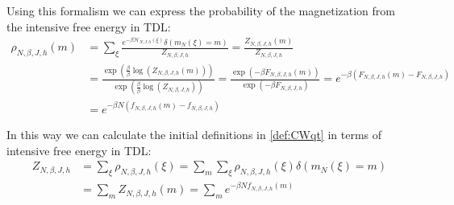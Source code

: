 \begin{proposition}
    Using this formalism we can express the probability of the magnetization from the intensive free energy in TDL:
    \begin{align}
        \rho_{N,\beta,J,h}(m) &= \sum_{\xi}\frac{ e^{-\beta \mathcal{H}_{N,J,h}(\xi)}  \delta\left(m_N(\xi)
        = m\right)}{Z_{N,\beta,J,h}}
        = \frac{Z_{N,\beta,J,h}(m)}{Z_{N,\beta,J,h}} \nonumber \\
        &= \frac{\exp\left(\frac{\beta}{\beta}\log\left(Z_{N,\beta,J,h}\left(m\right)\right)\right)}{\exp\left(\frac{\beta}{\beta}\log\left(Z_{N,\beta,J,h}\right)\right)}
        = \frac{\exp\left(-\beta F_{N,\beta,J,h}(m)\right)}{\exp\left(-\beta F_{N,\beta,J,h}\right)}
        = e^{-\beta(F_{N,\beta,J,h}(m)-F_{N,\beta,J,h})} \nonumber \\
        &= e^{-\beta N \left(f_{N,\beta,J,h}(m)-f_{N,\beta,J,h}\right)} \label{eq:Z_m_sum}
    \end{align}
\end{proposition}
\begin{remark}
    In this way we can calculate the initial definitions in \cref{def:CWqt} in terms of intensive free energy in TDL:
    \begin{align}
        Z_{N,\beta,J,h} &= \sum_\xi \rho_{N,\beta,J,h}(\xi) = \sum_m \sum_\xi \rho_{N,\beta,J,h}(\xi)  \delta(m_N(\xi) = m ) \nonumber \\
        &= \sum_m  Z_{N,\beta,J,h}(m) = \sum_m e^{-\beta N f_{N,\beta,J,h}(m)}
    \end{align}
\end{remark}

